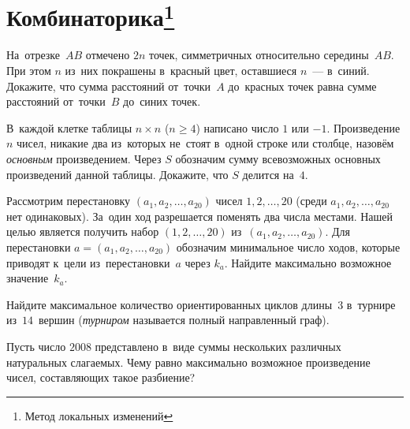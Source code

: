 

\section*{Комбинаторика\footnote{Метод локальных изменений}}


\begin{problems}

На~отрезке~$AB$ отмечено $2n$ точек, симметричных относительно середины~$AB$.
При этом $n$ из~них покрашены в~красный цвет, оставшиеся $n$~--- в~синий.
Докажите, что сумма расстояний от~точки~$A$ до~красных точек равна сумме
расстояний от~точки~$B$ до~синих точек.

\item
В~каждой клетке таблицы $n \times n$ ($n \geq 4$) написано число $1$ или $-1$.
Произведение $n$ чисел, никакие два из~которых не~стоят в~одной строке или
столбце, назовём \emph{основным} произведением.
Через $S$ обозначим сумму всевозможных основных произведений данной
таблицы.
Докажите, что $S$ делится на~$4$.

\item
Рассмотрим перестановку $(a_1, a_2, \ldots, a_{20})$ чисел $1, 2, \ldots, 20$
(среди $a_1, a_2, \ldots, a_{20}$ нет одинаковых).
За~один ход разрешается поменять два числа местами.
Нашей целью является получить набор $(1, 2, \ldots, 20)$
из~$(a_1,a_2, \ldots, a_{20})$.
Для перестановки $a = (a_1, a_2, \ldots, a_{20})$ обозначим минимальное число
ходов, которые приводят к~цели из~перестановки~$a$ через $k_a$.
Найдите максимально возможное значение~$k_a$.

\item
Найдите максимальное количество ориентированных циклов длины~$3$ в~турнире
из~$14$~вершин (\emph{турниром} называется полный направленный граф).

\item
Пусть число $2008$ представлено в~виде суммы нескольких различных натуральных
слагаемых.
Чему равно максимально возможное произведение чисел, составляющих такое
разбиение?

\end{problems}

